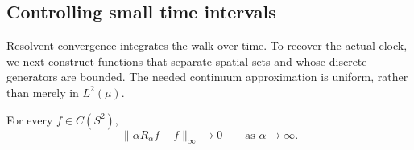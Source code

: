 \subsection{Controlling small time intervals}

Resolvent convergence integrates the walk over time.  To recover
the actual clock, we next construct functions that separate spatial
sets and whose discrete generators are bounded.  The needed continuum
approximation is uniform, rather than merely in $L^2(\mu)$.

\begin{lemma}\label{dyn:feller}
For every $f\in C(S^2)$,
\begin{equation}\label{dyn:approximate-identity}
 \|\alpha R_\alpha f-f\|_\infty\longrightarrow0
 \qquad\text{as }\alpha\longrightarrow\infty.
\end{equation}
\end{lemma}

